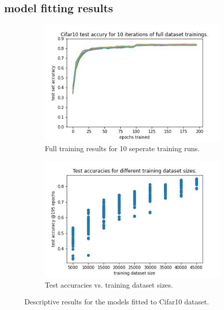 \documentclass{article} %
\begin{document}
\subsection{model fitting results}



\begin{figure}
    \begin{subfigure}{.5\textwidth}
        \centering
        \includegraphics[width=.8\linewidth]{Cifar10_full_dataset_acc_vs_epoch}
        \caption{Full training results for 10 seperate training runs.}
        \label{fig_full_dataset_epoch_vs_acc}
    \end{subfigure}%
    \begin{subfigure}{.5\textwidth}
        \centering
        \includegraphics[width=.8\linewidth]{Cifar10_training_datasetsize_vs_test_acc}
        \caption{Test accuracies vs. training dataset sizes.}
        \label{fig_traing_subset_size_vs_test_acc}
    \end{subfigure}

    \caption{Descriptive results for the models fitted to Cifar10 dataset.}
    \label{fig:desc_plots_cifar10}
\end{figure}
\end{document}
